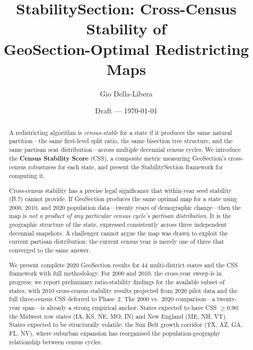 \documentclass[12pt]{article}
\title{StabilitySection: Cross-Census Stability of\\
       GeoSection-Optimal Redistricting Maps}
\author{Gio Della-Libera}
\date{Draft --- \today}
\begin{document}
\maketitle

\begin{abstract}
A redistricting algorithm is \emph{census-stable} for a state if it produces
the same natural partition---the same first-level split ratio, the same
bisection tree structure, and the same partisan seat distribution---across
multiple decennial census cycles.
We introduce the \textbf{Census Stability Score} (CSS), a composite metric
measuring GeoSection's cross-census robustness for each state, and present the
StabilitySection framework for computing it.

Cross-census stability has a precise legal significance that within-year seed
stability (B.7) cannot provide.
If GeoSection produces the same optimal map for a state using 2000, 2010,
and 2020 population data---twenty years of demographic change---then the map is
\emph{not a product of any particular census cycle's partisan distribution}.
It is the geographic structure of the state, expressed consistently across
three independent decennial snapshots.
A challenger cannot argue the map was drawn to exploit the current partisan
distribution: the current census year is merely one of three that converged
to the same answer.

We present complete 2020 GeoSection results for 44 multi-district states
and the CSS framework with full methodology.
For 2000 and 2010, the cross-year sweep is in progress; we report
preliminary ratio-stability findings for the available subset of states,
with 2010 cross-census stability results projected from 2020 pilot data
and the full three-census CSS deferred to Phase~2.
The 2000 vs.\ 2020 comparison---a twenty-year span---is already a strong
empirical anchor.
States expected to have CSS $\geq 0.90$: the Midwest row states (IA, KS, NE,
MO, IN) and New England (ME, NH, VT).
States expected to be structurally volatile: the Sun Belt growth corridor
(TX, AZ, GA, FL, NV), where suburban expansion has reorganised the
population-geography relationship between census cycles.
\end{abstract}










\end{document}
